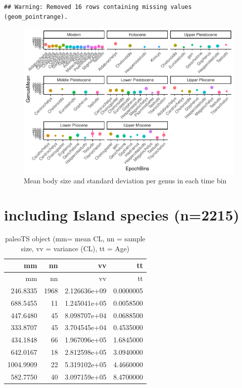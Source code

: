 \documentclass[]{article}
\begin{document}
\begin{verbatim}
## Warning: Removed 16 rows containing missing values (geom_pointrange).
\end{verbatim}

\begin{figure}[htbp]
\centering
\includegraphics{MA_JJ_files/figure-latex/Separate genera per time bin-1.pdf}
\caption{Mean body size and standard deviation per genus in each time
bin}
\end{figure}

\newpage

\section{including Island species
(n=2215)}\label{including-island-species-n2215}

\begin{longtable}[]{@{}rrrr@{}}
\caption{paleoTS object (mm= mean CL, nn = sample size, vv = variance
(CL), tt = Age)}\tabularnewline
\toprule
mm & nn & vv & tt\tabularnewline
\midrule
\endfirsthead
\toprule
mm & nn & vv & tt\tabularnewline
\midrule
\endhead
246.8335 & 1968 & 2.126636e+09 & 0.0000005\tabularnewline
688.5455 & 11 & 1.245041e+05 & 0.0058500\tabularnewline
447.6480 & 45 & 8.098707e+04 & 0.0688500\tabularnewline
333.8707 & 45 & 3.704545e+04 & 0.4535000\tabularnewline
434.1848 & 66 & 1.967096e+05 & 1.6845000\tabularnewline
642.0167 & 18 & 2.812598e+05 & 3.0940000\tabularnewline
1004.9909 & 22 & 5.319102e+05 & 4.4660000\tabularnewline
582.7750 & 40 & 3.097159e+05 & 8.4700000\tabularnewline
\bottomrule
\end{longtable}
\end{document}
